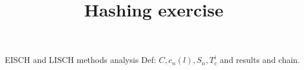 \documentclass[12pt,notitlepage]{article}
\title{Hashing exercise}
\begin{document}

\begin{section}{EISCH and LISCH methods analysis}
Def: $C, c_n(l), S_n, T_c^i$ and results and chain.

\end{section}
\end{document}

